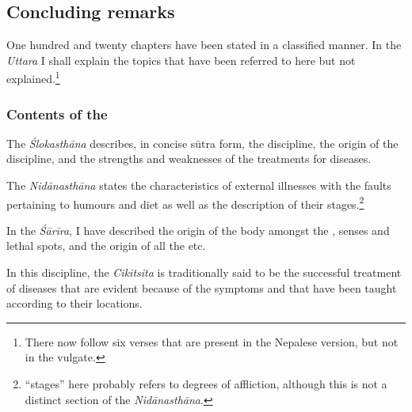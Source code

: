 \begin{translation}
\subsection{Concluding remarks}

\item[140]

One hundred and twenty chapters have been stated in a classified manner. In 
the \emph{Uttara} I shall explain the topics that have been referred to here but 
not explained.\footnote{There now follow six verses that are present in the 
Nepalese version, but not in the vulgate.}

\subsubsection{Contents of the \SS}

\item[140 add 1]

The \emph{Ślokasthāna} describes, in concise sūtra form, the
discipline, the origin of the discipline, and the strengths and
weaknesses of the treatments for diseases.

\item[140 add 2]

The \emph{Nidānasthāna} states the characteristics of external
illnesses with the faults pertaining to humours and diet as well as
the description of their stages.\footnote{ “stages” here
    probably refers to degrees of affliction, although this is not a
    distinct section of the \emph{Nidānasthāna}.} 
    

\item[140 add 3]

In the \emph{Śārīra}, I have described the origin of the body amongst the 
, senses and lethal spots, and the origin of all the 
 etc. 

\item[140 add 4]

In this discipline, the \emph{Cikitsita} is traditionally said to be the successful 
treatment of diseases that are evident because of the symptoms and that have 
been taught according to their locations.

\item[140 add 5]


\end{translation}
